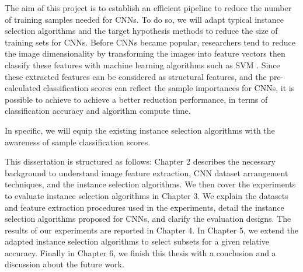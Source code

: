 The aim of this project is to establish an efficient pipeline to reduce the number of training samples needed for CNNs. To do so, we will adapt typical instance selection algorithms and the target hypothesis methods to reduce the size of training sets for CNNs. Before CNNs became popular, researchers tend to reduce the image dimensionality by transforming the images into feature vectors then classify these features with machine learning algorithms such as SVM \cite{Popovici2003, Csurka2004}. Since these extracted features can be considered as structural features, and the pre-calculated classification scores can reflect the sample importances for CNNs, it is possible to achieve to achieve a better reduction performance, in terms of classification accuracy and algorithm compute time. 

In specific, we will equip the existing instance selection algorithms with the awareness of sample classification scores. 

This dissertation is structured as follows: Chapter 2 describes the necessary background to understand image feature extraction, CNN dataset arrangement techniques, and the instance selection algorithms. We then cover the experiments to evaluate instance selection algorithms in Chapter 3. We explain the datasets and feature extraction procedures used in the experiments, detail the instance selection algorithms proposed for CNNs, and clarify the evaluation designs. The results of our experiments are reported in Chapter 4. In Chapter 5, we extend the adapted instance selection algorithms to select subsets for a given relative accuracy. Finally in Chapter 6, we finish this thesis with a conclusion and a discussion about the future work.



